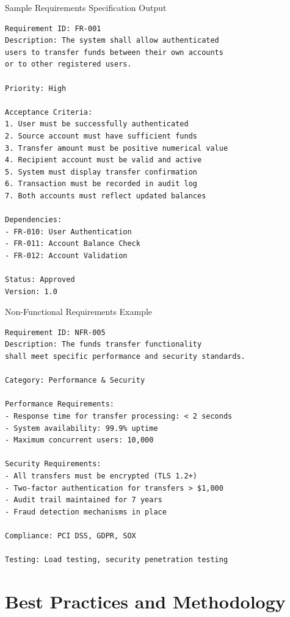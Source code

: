 \documentclass{beamer}
\begin{document}
\begin{frame}[fragile]{Sample Requirements Specification Output}
    \lstset{style=code}
    \begin{lstlisting}[caption={Functional Requirements Specification}]
Requirement ID: FR-001
Description: The system shall allow authenticated 
users to transfer funds between their own accounts 
or to other registered users.

Priority: High

Acceptance Criteria:
1. User must be successfully authenticated
2. Source account must have sufficient funds
3. Transfer amount must be positive numerical value
4. Recipient account must be valid and active
5. System must display transfer confirmation
6. Transaction must be recorded in audit log
7. Both accounts must reflect updated balances

Dependencies: 
- FR-010: User Authentication
- FR-011: Account Balance Check
- FR-012: Account Validation

Status: Approved
Version: 1.0
    \end{lstlisting}
\end{frame}

\begin{frame}[fragile]{Non-Functional Requirements Example}
    \lstset{style=code}
    \begin{lstlisting}[caption={Non-Functional Requirements}]
Requirement ID: NFR-005
Description: The funds transfer functionality 
shall meet specific performance and security standards.

Category: Performance & Security

Performance Requirements:
- Response time for transfer processing: < 2 seconds
- System availability: 99.9% uptime
- Maximum concurrent users: 10,000

Security Requirements:
- All transfers must be encrypted (TLS 1.2+)
- Two-factor authentication for transfers > $1,000
- Audit trail maintained for 7 years
- Fraud detection mechanisms in place

Compliance: PCI DSS, GDPR, SOX

Testing: Load testing, security penetration testing
    \end{lstlisting}
\end{frame}

\section{Best Practices and Methodology}
\end{document}
